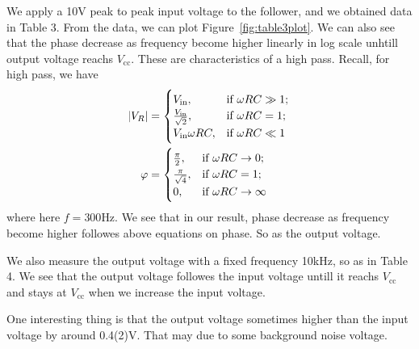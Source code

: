 \documentclass[aps,prl,reprint]{revtex4-1}
\newcommand{\vcc}{V_\text{cc}}
\begin{document}
We apply a 10V peak to peak input voltage to the follower, and we obtained data in Table 3. From the data, we can plot Figure~\ref{fig:table3plot}. We can also see that the phase decrease as frequency become higher linearly in log scale unhtill output voltage reachs $\vcc$. These are characteristics of a high pass. Recall, for high pass, we have
\begin{align*}
    \abs{V_R} &= 
    \begin{cases}
        V_\text{in},                & \text{if } \omega R C \gg 1;\\
        \frac{V_\text{in}}{\sqrt{2}}, & \text{if } \omega R C = 1;\\
        V_\text{in}\omega R C,      & \text{if } \omega R C \ll 1\\
    \end{cases}\\
    \varphi &= 
    \begin{cases}
        \frac{\pi}{2},                & \text{if } \omega R C \rightarrow 0;\\
        \frac{\pi}{\sqrt{4}}, & \text{if } \omega R C = 1;\\
        0,      & \text{if } \omega R C \rightarrow \infty\\
    \end{cases}\\
\end{align*}
where here $f = 300$Hz. We see that in our result, phase decrease as frequency become higher followes above equations on phase. So as the output voltage.

We also measure the output voltage with a fixed frequency 10kHz, so as in Table 4. We see that the output voltage followes the input voltage untill it reachs $\vcc$ and stays at $\vcc$ when we increase the input voltage.

One interesting thing is that the output voltage sometimes higher than the input voltage by around 0.4(2)V. That may due to some background noise voltage.
\end{document}
